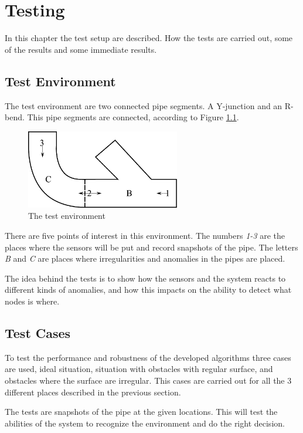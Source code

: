 \chapter{Testing}
\label{chap7}
In this chapter the test setup are described. How the tests are carried out, 
some of the results and some immediate results.


\section{Test Environment}
The test environment are two connected pipe segments. A Y-junction and an R-bend. This
pipe segments are connected, according to Figure \ref{chap7:fig-environment}.
\begin{figure}[htbp]
    \centering
    \includegraphics[width=0.6\textwidth]{pics/test-environment}
    \caption{The test environment}
    \label{chap7:fig-environment}
\end{figure}
There are five points of interest in this environment. 
The numbers \emph{1-3} are the places where the sensors will be put and record snapshots of the pipe. 
The letters \emph{B} and \emph{C} are places where irregularities and anomalies in the pipes are placed. 

The idea behind the tests is to show how the sensors and the system reacts to different
kinds of anomalies, and how this impacts on the ability to detect what nodes is where. 


\section{Test Cases}
To test the performance and robustness of the developed algorithms three cases are used,
ideal situation, situation with obstacles with regular surface, and obstacles where the
surface are irregular. This cases are carried out for all the 3 different places described
in the previous section.

The tests are snapshots of the pipe at the given locations. This will test the abilities
of the system to recognize the environment and do the right decision. 


